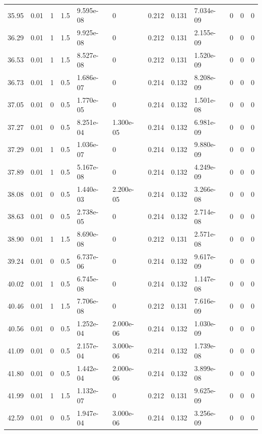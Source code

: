 \documentclass[preview]{standalone}
\begin{document}
{{{\begin{tabular}{L{1.2cm}C{1.2cm} C{0.3cm}C{0.5cm} C{1.4cm}C{1.4cm} C{1.4cm}C{1.4cm} C{1.6cm}C{1.6cm} C{1.6cm}C{1.6cm}}
  35.95  &  0.01  & 1     & 1.5 &  9.595e-08  & 0  &  0.212&   0.131& 7.034e-09 & 0   &  0 & 0  \\ 
  36.29  &  0.01  & 1     & 1.5 &  9.925e-08  & 0  &  0.212&   0.131& 2.155e-09 & 0   &  0 & 0  \\ 
  36.53  &  0.01  & 1     & 1.5 &  8.527e-08  & 0  &  0.212&   0.131& 1.520e-09 & 0   &  0 & 0  \\ 
  36.73  &  0.01  & 1     & 0.5 &  1.686e-07  & 0  &  0.214&   0.132& 8.208e-09 & 0   &  0 & 0  \\ 
  37.05  &  0.01  & 0     & 0.5 &  1.770e-05  & 0  &  0.214&   0.132& 1.501e-08 & 0   &  0 & 0  \\ 
  37.27  &  0.01  & 0     & 0.5 &  8.251e-04  & 1.300e-05  &  0.214&   0.132& 6.981e-09 & 0   &  0 & 0  \\ 
  37.29  &  0.01  & 1     & 0.5 &  1.036e-07  & 0  &  0.214&   0.132& 9.880e-09 & 0   &  0 & 0  \\ 
  37.89  &  0.01  & 1     & 0.5 &  5.167e-08  & 0  &  0.214&   0.132& 4.249e-09 & 0   &  0 & 0  \\ 
  38.08  &  0.01  & 0     & 0.5 &  1.440e-03  & 2.200e-05  &  0.214&   0.132& 3.266e-08 & 0   &  0 & 0  \\ 
  38.63  &  0.01  & 0     & 0.5 &  2.738e-05  & 0  &  0.214&   0.132& 2.714e-08 & 0   &  0 & 0  \\ 
  38.90  &  0.01  & 1     & 1.5 &  8.690e-08  & 0  &  0.212&   0.131& 2.571e-08 & 0   &  0 & 0  \\ 
  39.24  &  0.01  & 0     & 0.5 &  6.737e-06  & 0  &  0.214&   0.132& 9.617e-09 & 0   &  0 & 0  \\ 
  40.02  &  0.01  & 1     & 0.5 &  6.745e-08  & 0  &  0.214&   0.132& 1.147e-08 & 0   &  0 & 0  \\ 
  40.46  &  0.01  & 1     & 1.5 &  7.706e-08  & 0  &  0.212&   0.131& 7.616e-09 & 0   &  0 & 0  \\ 
  40.56  &  0.01  & 0     & 0.5 &  1.252e-04  & 2.000e-06  &  0.214&   0.132& 1.030e-09 & 0   &  0 & 0  \\ 
  41.09  &  0.01  & 0     & 0.5 &  2.157e-04  & 3.000e-06  &  0.214&   0.132& 1.739e-08 & 0   &  0 & 0  \\ 
  41.80  &  0.01  & 0     & 0.5 &  1.442e-04  & 2.000e-06  &  0.214&   0.132& 3.899e-08 & 0   &  0 & 0  \\ 
  41.99  &  0.01  & 1     & 1.5 &  1.132e-07  & 0  &  0.212&   0.131& 9.625e-09 & 0   &  0 & 0  \\ 
  42.59  &  0.01  & 0     & 0.5 &  1.947e-04  & 3.000e-06  &  0.214&   0.132& 3.256e-09 & 0   &  0 & 0  \\ 

\end{tabular}}}}
\end{document}
